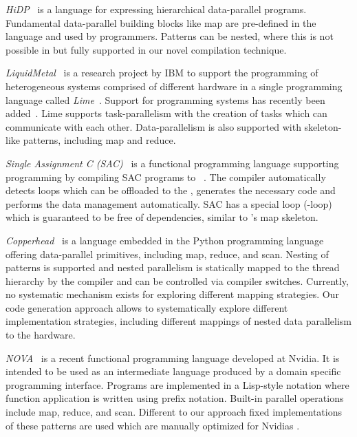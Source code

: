 \bigskip

\emph{{\small HiDP}}~\cite{ZhangM13} is a language for expressing hierarchical data-parallel programs.
Fundamental data-parallel building blocks like map are pre-defined in the language and used by programmers.
Patterns can be nested, where this is not possible in \SkelCL but fully supported in our novel compilation technique.

\bigskip

\emph{LiquidMetal}~\cite{HuangHBR08} is a research project by IBM to support the programming of heterogeneous systems comprised of different hardware in a single programming language called \emph{Lime}~\cite{AuerbachBCR10}.
Support for programming \GPU systems has recently been added~\cite{DubachCRBF12}.
Lime supports task-parallelism with the creation of tasks which can communicate with each other.
Data-parallelism is also supported with skeleton-like patterns, including map and reduce.

\bigskip

\emph{Single Assignment C (SAC)}~\cite{GrelckS06} is a functional programming language supporting \GPU programming by compiling SAC programs to \CUDA~\cite{GuoTS11}.
The compiler automatically detects loops which can be offloaded to the \GPU, generates the necessary \CUDA code and performs the data management automatically.
SAC has a special loop (-loop) which is guaranteed to be free of dependencies, similar to \SkelCL's map skeleton.

\bigskip

\emph{Copperhead}~\cite{CatanzaroGK11} is a \GPU language embedded in the Python programming language offering data-parallel primitives, including map, reduce, and scan.
Nesting of patterns is supported and nested parallelism is statically mapped to the \GPU thread hierarchy by the compiler and can be controlled via compiler switches.
Currently, no systematic mechanism exists for exploring different mapping strategies.
Our code generation approach allows to systematically explore different implementation strategies, including different mappings of nested data parallelism to the hardware.

\bigskip

\emph{{\small NOVA}}~\cite{CollinsGGLS14} is a recent functional \GPU programming language developed at Nvidia.
It is intended to be used as an intermediate language produced by a domain specific programming interface.
Programs are implemented in a Lisp-style notation where function application is written using prefix notation.
Built-in parallel operations include map, reduce, and scan.
Different to our approach fixed implementations of these patterns are used which are manually optimized for Nvidias \GPUs.

